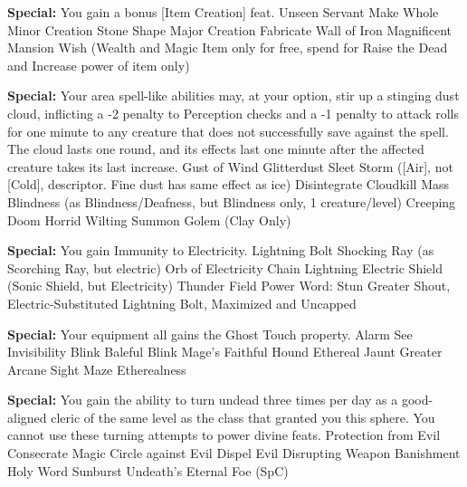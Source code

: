 \begin{multicols}{2}
\textbf{Special: }{You gain a bonus [Item Creation] feat.}
\sphere
{Unseen Servant}
{Make Whole}
{Minor Creation}
{Stone Shape}
{Major Creation}
{Fabricate}
{Wall of Iron}
{Magnificent Mansion}
{Wish (Wealth and Magic Item only for free, spend for Raise the Dead and Increase power of item only)}

\textbf{Special: }{Your area spell-like abilities may, at your option, stir up a stinging dust cloud, inflicting a -2 penalty to Perception checks and a -1 penalty to attack rolls for one minute to any creature that does not successfully save against the spell. The cloud lasts one round, and its effects last one minute after the affected creature takes its last increase.}
\sphere
{Gust of Wind}
{Glitterdust}
{Sleet Storm ([Air], not [Cold], descriptor. Fine dust has same effect as ice)}
{Disintegrate}
{Cloudkill}
{Mass Blindness (as Blindness/Deafness, but Blindness only, 1 creature/level)}
{Creeping Doom}
{Horrid Wilting}
{Summon Golem (Clay Only)}

\textbf{Special: }{You gain Immunity to Electricity.}
\sphere
{Lightning Bolt}
{Shocking Ray (as Scorching Ray, but electric)}
{Orb of Electricity}
{Chain Lightning}
{Electric Shield (Sonic Shield, but Electricity)}
{Thunder Field}
{Power Word: Stun}
{Greater Shout, Electric-Substituted}
{Lightning Bolt, Maximized and Uncapped}

\textbf{Special: }{Your equipment all gains the Ghost Touch property.}
\sphere
{Alarm}
{See Invisibility}
{Blink}
{Baleful Blink}
{Mage's Faithful Hound}
{Ethereal Jaunt}
{Greater Arcane Sight}
{Maze}
{Etherealness}

\textbf{Special: }{You gain the ability to turn undead three times per day as a good-aligned cleric of the same level as the class that granted you this sphere. You cannot use these turning attempts to power divine feats.}
\sphere
{Protection from Evil}
{Consecrate}
{Magic Circle against Evil}
{Dispel Evil}
{Disrupting Weapon}
{Banishment}
{Holy Word}
{Sunburst}
{Undeath's Eternal Foe (SpC)}


\end{multicols}
